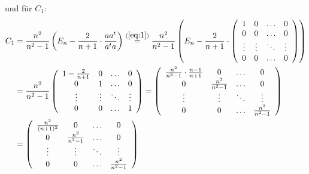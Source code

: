 \documentclass[11pt,a4paper,ngerman]{article}
\begin{document}
\begin{enumerate}[(a)]
    und für $C_1$:
    \begin{equation*}\begin{split}
      C_1 &= \frac{n^2}{n^2-1} \left(E_n - \frac{2}{n+1} \cdot \frac{a a^t}{a^t a} \right) 
          \stackrel{(\ref{eq:1})}{=} \frac{n^2}{n^2-1} \left(E_n - \frac{2}{n+1} \cdot
                  \left(\begin{array}{cccc} 1 & 0 & \hdots & 0 \\
                                            0 & 0 & \hdots & 0 \\
                                            \vdots & \vdots & \ddots & \vdots \\
                                            0 & 0 & \hdots & 0
                  \end{array} \right)
              \right) \\
          &=  \frac{n^2}{n^2-1}  \left(\begin{array}{cccc} 1-\frac{2}{n+1} & 0 & \hdots & 0 \\
                                            0 & 1 & \hdots & 0 \\
                                            \vdots & \vdots & \ddots & \vdots \\
                                            0 & 0 & \hdots & 1
                  \end{array} \right) 
          = \left(\begin{array}{cccc} \frac{n^2}{n^2-1} \cdot \frac{n-1}{n+1} & 0 & \hdots & 0 \\
                                            0 & \frac{n^2}{n^2-1} & \hdots & 0 \\
                                            \vdots & \vdots & \ddots & \vdots \\
                                            0 & 0 & \hdots & \frac{n^2}{n^2-1}
                  \end{array} \right) \\
          &= \left(\begin{array}{cccc} \frac{n^2}{(n+1)^2} & 0 & \hdots & 0 \\
                                            0 & \frac{n^2}{n^2-1} & \hdots & 0 \\
                                            \vdots & \vdots & \ddots & \vdots \\
                                            0 & 0 & \hdots & \frac{n^2}{n^2-1}
                  \end{array} \right)

\end{split}
\end{equation*}
\end{enumerate}
\end{document}
